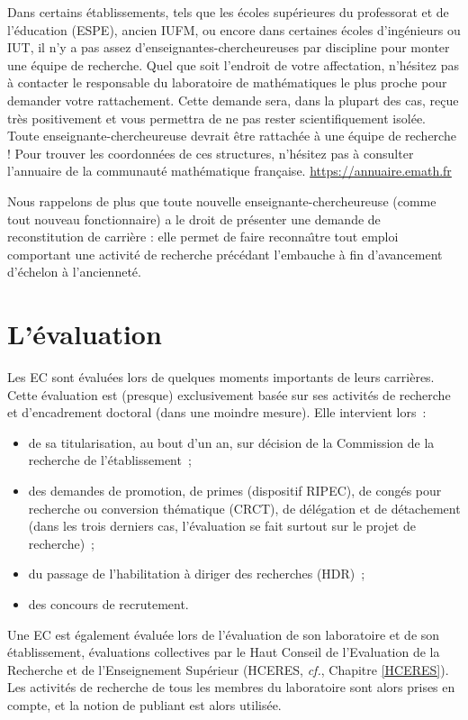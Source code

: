 Dans certains \'etablissements, tels que 
les \'ecoles sup\'erieures du professorat et de l'\'education (ESPE), ancien IUFM,
ou encore dans
certaines \'ecoles d'ing\'enieurs ou IUT, il n'y a pas assez
d'enseignant\mp e\mp s-chercheur\mp euse\mp s par discipline pour monter une \'equipe de
recherche.
Quel que soit l'endroit de votre affectation, n'h\'esitez pas
\`a contacter le responsable du laboratoire de math\'e\-matiques le plus
proche pour demander votre rattachement. Cette demande sera, dans la
plupart des cas, re\c cue tr\`es positivement et vous permettra de ne
pas rester scientifiquement isol\'e\mp e. Tout\mp e enseignant\mp e-chercheur\mp euse
devrait \^etre rattach\'e\mp e \`a une \'equipe de
recherche ! Pour trouver les coordonn\'ees de ces structures, n'h\'esitez pas \`a
consulter l'annuaire de la communaut\'e math\'e\-matique
fran\c caise. \url{https://annuaire.emath.fr}

Nous rappelons de plus que tout\mp e nouvel\mp le enseignant\mp e-chercheur\mp euse (comme tout nouveau fonctionnaire)
a le droit de pr\'esenter une demande de reconstitution de carri\`ere : elle permet de faire reconna\^\i tre tout emploi comportant une activit\'e de recherche pr\'ec\'edant l'embauche \`a fin d'avancement d'\'echelon \`a l'anciennet\'e.

\section{L'\'evaluation}

Les EC sont \'evalu\'e\mp e\mp s lors de quelques moments importants de leurs carri\`eres.
Cette \'evaluation est (presque) exclusivement bas\'ee sur ses activit\'es de recherche
et d'encadrement doctoral (dans une moindre mesure).
Elle intervient lors~:
\begin{itemize}
\item de sa titularisation, au bout d'un an, sur d\'ecision de la Commission de la recherche de l'\'etablissement~;
\item des demandes de promotion, de primes (dispositif RIPEC),
de cong\'es pour recherche ou conversion
th\'ematique (CRCT), de d\'el\'egation et de d\'etachement (dans les
trois derniers cas, l'\'evaluation se fait surtout sur le projet de
recherche)~;
\item du passage de l'habilitation \`a diriger des recherches (HDR)~;
\item des concours de recrutement.
\end{itemize}
Un\mp e EC est \'egalement \'evalu\'e\mp e lors de l'\'evaluation de son laboratoire
et de son \'etablissement,
\'evaluations collectives par le Haut Conseil de l'Evaluation de la
Recherche et de l'Enseignement Sup\'erieur (HCERES, {\em cf.}, Chapitre \ref{HCERES}).
Les activit\'es de recherche de tous les membres du
laboratoire sont alors prises en compte, et la notion de \og publiant\fg{} est
alors utilis\'ee.
%

